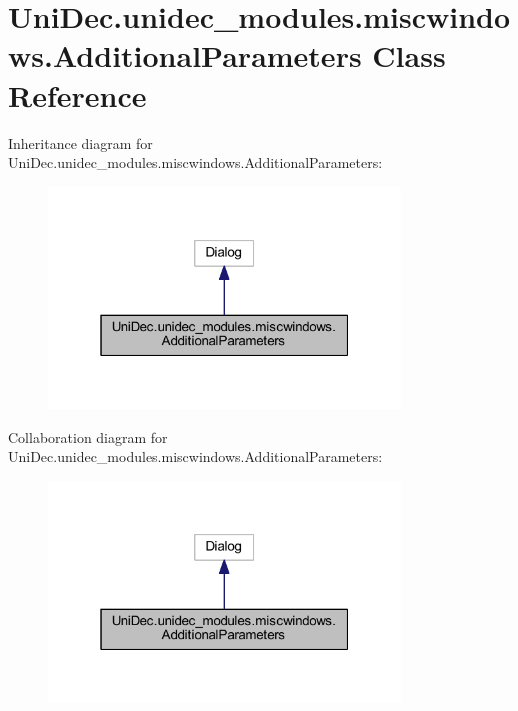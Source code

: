\hypertarget{class_uni_dec_1_1unidec__modules_1_1miscwindows_1_1_additional_parameters}{}\section{Uni\+Dec.\+unidec\+\_\+modules.\+miscwindows.\+Additional\+Parameters Class Reference}
\label{class_uni_dec_1_1unidec__modules_1_1miscwindows_1_1_additional_parameters}


Inheritance diagram for Uni\+Dec.\+unidec\+\_\+modules.\+miscwindows.\+Additional\+Parameters\+:\nopagebreak
\begin{figure}[H]
\begin{center}
\leavevmode
\includegraphics[width=265pt]{class_uni_dec_1_1unidec__modules_1_1miscwindows_1_1_additional_parameters__inherit__graph}
\end{center}
\end{figure}


Collaboration diagram for Uni\+Dec.\+unidec\+\_\+modules.\+miscwindows.\+Additional\+Parameters\+:\nopagebreak
\begin{figure}[H]
\begin{center}
\leavevmode
\includegraphics[width=265pt]{class_uni_dec_1_1unidec__modules_1_1miscwindows_1_1_additional_parameters__coll__graph}
\end{center}
\end{figure}
